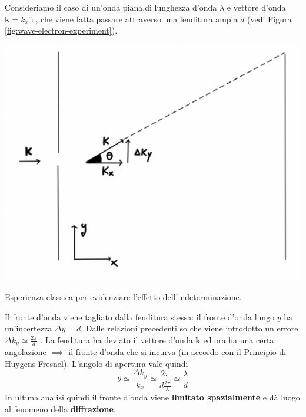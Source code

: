 Consideriamo il caso di un'onda piana,di lunghezza d'onda \(\lambda\) e
vettore d'onda \(\bm{k} = k_x \hat{\imath}\), che viene fatta passare
attraverso una fenditura ampia \(d\) (vedi Figura \ref{fig:wave-electron-experiment}).

\begin{marginfigure}
	\includegraphics{figs/wave-electron-experiment}
	\caption{Esperienza classica per evidenziare l'effetto dell'indeterminazione.}
	\label{fig:wave-electron-experiment}
\end{marginfigure}

Il fronte d'onda viene tagliato dalla fenditura stessa: il fronte d'onda
lungo \(y\) ha un'incertezza \(\Delta y = d\).
Dalle relazioni
precedenti so che viene introdotto un errore
\(\Delta k_{y} \simeq\frac{2\pi}{d}\) .
La fenditura ha deviato il
vettore d'onda \(\bm{k}\) ed ora ha una certa angolazione \(\implies\)
il fronte d'onda che si incurva (in accordo con il Principio di Huygens-Fresnel).
L'angolo di apertura vale quindi \[
	\theta \simeq\frac{\Delta k_{y}}{k_{x}} \simeq \frac{2\pi}{d  \frac{2\pi}{\lambda}} \simeq\frac{\lambda}{d}
\] In ultima analisi quindi il fronte d'onda viene \textbf{limitato
	spazialmente} e dà luogo al fenomeno della \textbf{diffrazione}.

